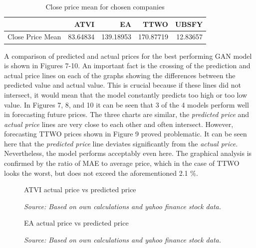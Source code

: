 \documentclass[review]{elsarticle} %
\begin{document}
       \begin{table}[H]
       \centering
       \caption{Close price mean for chosen companies}
       \begin{tabular}{lrrrr}
       \toprule
        & ATVI & EA & TTWO & UBSFY \\
       \midrule
       Close Price Mean & 83.64834 & 139.18953 & 170.87719 & 12.83657 \\
       \bottomrule
       \end{tabular}
       \end{table}
       
       
       


A comparison of predicted and actual prices for the best performing GAN model is shown in Figures 7-10. An important fact is the crossing of the prediction and actual price lines on each of the graphs showing the differences between the predicted value and actual value. This is crucial because if these lines did not intersect, it would mean that the model constantly predicts too high or too low value. In Figures 7, 8, and 10 it can be seen that 3 of the 4 models perform well in forecasting future prices. The three charts are similar, the \textit{predicted price} and \textit{actual price} lines are very close to each other and often intersect. However, forecasting TTWO prices shown in Figure 9 proved problematic. It can be seen here that the \textit{predicted price} line deviates significantly from the \textit{actual price}. Nevertheless, the model performs acceptably even here. The graphical analysis is confirmed by the ratio of MAE to average price, which in the case of TTWO looks the worst, but does not exceed the aforementioned 2.1 \%.
\\

\begin{figure}[H]
\caption{ATVI actual price vs predicted price}
\begin{adjustbox}{width=1.3\textwidth,center}

\end{adjustbox}
\caption*{\textit{Source: Based on own calculations and yahoo finance stock data.}}
\end{figure}

\begin{figure}[H]
\caption{EA actual price vs predicted price}
\begin{adjustbox}{width=1.3\textwidth,center}

\end{adjustbox}
\caption*{\textit{Source: Based on own calculations and yahoo finance stock data.}}
\end{figure}
\end{document}
